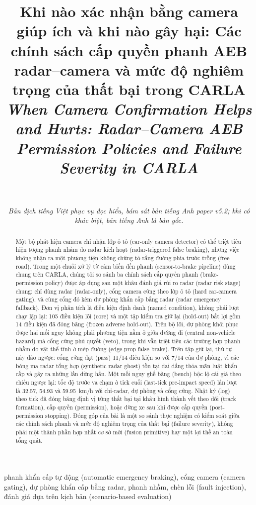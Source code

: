 \documentclass[conference]{IEEEtran}
\title{Khi nào xác nhận bằng camera giúp ích và khi nào gây hại: Các chính sách cấp quyền phanh AEB radar--camera và mức độ nghiêm trọng của thất bại trong CARLA\\[0.4em]
{\Large\itshape When Camera Confirmation Helps and Hurts: Radar--Camera AEB Permission Policies and Failure Severity in CARLA}}
\author{
\IEEEauthorblockN{Mai Viet Hoang and Duc An Pham}
\IEEEauthorblockA{\textit{Hanoi University of Science and Technology}\\
Hanoi, Vietnam\\hoangmai04222@gmail.com}\\[0.6em]
\parbox{0.9\textwidth}{\centering\small\itshape Bản dịch tiếng Việt phục vụ đọc hiểu, bám sát bản tiếng Anh paper v5.2; khi có khác biệt, bản tiếng Anh là bản gốc.}
}
\begin{document}
\maketitle

\begin{abstract}
Một bộ phát hiện camera chỉ nhận lớp ô tô (car-only camera detector) có thể
triệt tiêu hiện tượng phanh nhầm do radar kích hoạt (radar-triggered false
braking), nhưng việc không nhận ra một phương tiện không chứng tỏ rằng đường
phía trước trống (free road). Trong một chuỗi xử lý từ cảm biến đến phanh
(sensor-to-brake pipeline) dùng chung trên CARLA, chúng tôi so sánh ba chính
sách cấp quyền phanh (brake-permission policy) được áp dụng sau một khâu đánh
giá rủi ro radar (radar risk stage) chung: chỉ dùng radar (radar-only), cổng
camera cứng theo lớp ô tô (hard car-camera gating), và cùng cổng đó kèm dự
phòng khẩn cấp bằng radar (radar emergency fallback). Đơn vị phân tích là điều
kiện định danh (named condition), không phải lượt chạy lặp lại: 105 điều kiện
lõi (core) và một tập kiểm tra giữ lại (hold-out) bất lợi gồm 14 điều kiện đã
đóng băng (frozen adverse hold-out). Trên bộ lõi, dự phòng khôi phục được hai
mối nguy không phải phương tiện nằm ở giữa đường đi (central non-vehicle
hazard) mà cổng cứng phủ quyết (veto), trong khi vẫn triệt tiêu các trường hợp
phanh nhầm do vật thể tĩnh ở mép đường (edge-prop false brake). Trên tập giữ
lại, thứ tự này đảo ngược: cổng cứng đạt (pass) 11/14 điều kiện so với 7/14
của dự phòng, vì các bóng ma radar tổng hợp (synthetic radar ghost) tồn tại dai
dẳng thỏa mãn luật khẩn cấp và gây ra những lần dừng hẳn. Một mối nguy ghế băng
(bench) bộc lộ cái giá theo chiều ngược lại: tốc độ trước va chạm ở tick cuối
(last-tick pre-impact speed) lần lượt là 32.57, 54.93 và 59.95~km/h với
chỉ-radar, dự phòng và cổng cứng. Nhật ký (log) theo tick đã đóng băng định vị
từng thất bại tại khâu hình thành vết theo dõi (track formation), cấp quyền
(permission), hoặc dừng xe sau khi được cấp quyền (post-permission stopping).
Đóng góp của bài là một so sánh thực nghiệm có kiểm soát giữa các chính sách
phanh và mức độ nghiêm trọng của thất bại (failure severity), không phải một
thành phần hợp nhất cơ sở mới (fusion primitive) hay một lợi thế an toàn tổng
quát.
\end{abstract}
\begin{IEEEkeywords}
phanh khẩn cấp tự động (automatic emergency
braking), cổng camera (camera gating), dự phòng khẩn cấp bằng radar, phanh
nhầm, chèn lỗi (fault injection), đánh giá dựa trên kịch bản (scenario-based
evaluation)
\end{IEEEkeywords}
\end{document}
